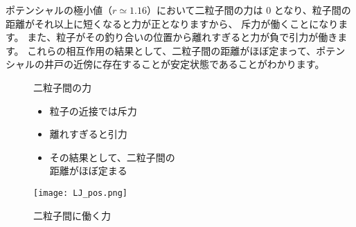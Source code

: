\documentclass[uplatex,dvipdfmx,a4paper,11pt]{jsarticle}
\begin{document}
ポテンシャルの極小値（$r \simeq 1.16$）において二粒子間の力は 0 となり、粒子間の距離がそれ以上に短くなると力が正となりますから、
斥力が働くことになります。
また、粒子がその釣り合いの位置から離れすぎると力が負で引力が働きます。
これらの相互作用の結果として、二粒子間の距離がほぼ定まって、ポテンシャルの井戸の近傍に存在することが安定状態であることがわかります。
\begin{figure}[htb]
	\begin{center}
		\begin{minipage}{0.45\textwidth}
			\large
			\begin{itembox}[l]{二粒子間の力}
				\begin{itemize}
					\item 粒子の近接では斥力
					\item 離れすぎると引力
					\item その結果として、二粒子間の\\距離がほぼ定まる
				\end{itemize}
			\end{itembox}
		\end{minipage}
		\begin{minipage}{0.45\textwidth}
			\begin{center}
			\texttt{[image: LJ\_pos.png]}
			\end{center}
		\end{minipage}
		\caption{二粒子間に働く力}
		\label{fig:lj-pos}
	\end{center}
\end{figure}
\end{document}
